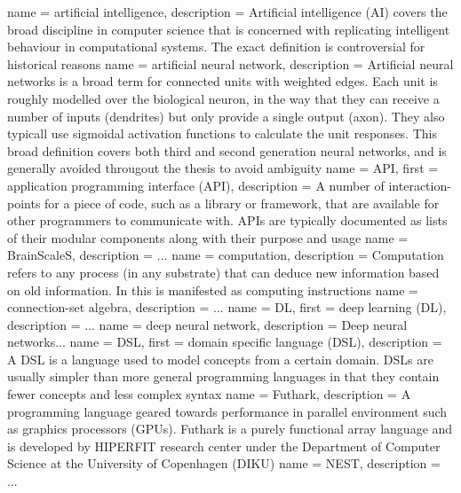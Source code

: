  {
    name = artificial intelligence,
    description = {Artificial intelligence (AI) covers the broad discipline in computer science
that is concerned with replicating intelligent behaviour in computational systems. The exact
definition is controversial for historical reasons \autocite{Nilsson2009}}
}
 {
  name = artificial neural network,
  description = {
    Artificial neural networks is a broad term for connected units with 
    weighted edges.
    Each unit is roughly modelled over the biological neuron, in the way 
    that they can receive a number of inputs (dendrites) 
    but only provide a single output (axon).
    They also typicall use sigmoidal activation functions to calculate the 
    unit responses.
    This broad definition covers both third and second generation neural
    networks, and is generally avoided througout the thesis to avoid 
    ambiguity}
}
 {
  name = API,
  first = {application programming interface (API)},
  description = {A number of interaction-points for a piece of code,
		 such as a library or framework, that are available for
		 other programmers to communicate with. APIs are typically
		 documented as lists of their modular components along
		 with their purpose and usage}
}
 {
  name = BrainScaleS,
  description = {...}
}
 {
   name = computation,
   description = {Computation refers to any process (in any
substrate) that can deduce new information based on old information. In
this is manifested as computing instructions}
}
 {
  name = {connection-set algebra},
  description = {...}
}
 {
  name = {DL},
  first = {deep learning (DL)},
  description = {...}
}
 {
  name = {deep neural network},
  description = {Deep neural networks...}
}
 {
  name = {DSL},
  first = {domain specific language (DSL)},
  description = {A DSL is a language used to model concepts from a certain
    domain. DSLs are usually simpler than more general programming languages in
    that they contain fewer concepts and less complex syntax}
}
 {
   name = {Futhark},
   description = {A programming language geared towards performance in parallel environment such as
   graphics processors (GPUs). Futhark is a purely functional array language and is
   developed by HIPERFIT research center under the Department of Computer Science at the
   University of Copenhagen (DIKU)}
}
 {
  name = NEST,
  description = {...}
}
